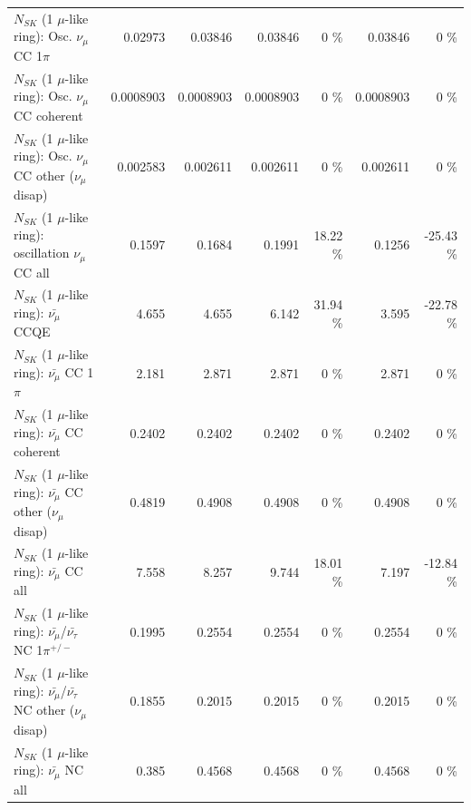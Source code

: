 \begin{table}
\begin{tabular}{| l | r | r | r  r | r  r |}
                          $N_{SK}$ (1 $\mu$-like ring): Osc. $\nu_\mu$ CC 1$\pi$ &         0.02973 &         0.03846 &         0.03846 &        0 \%  &         0.03846 &        0 \%  \\ 
                        $N_{SK}$ (1 $\mu$-like ring): Osc. $\nu_\mu$ CC coherent &       0.0008903 &       0.0008903 &       0.0008903 &        0 \%  &       0.0008903 &        0 \%  \\ 
         $N_{SK}$ (1 $\mu$-like ring): Osc. $\nu_\mu$ CC other ($\nu_\mu$ disap) &        0.002583 &        0.002611 &        0.002611 &        0 \%  &        0.002611 &        0 \%  \\ 
                      $N_{SK}$ (1 $\mu$-like ring): oscillation $\nu_\mu$ CC all &          0.1597 &          0.1684 &          0.1991 &    18.22 \%  &          0.1256 &   -25.43 \%  \\ 
\hline
\hline
                              $N_{SK}$ (1 $\mu$-like ring): $\bar{\nu_\mu}$ CCQE &           4.655 &           4.655 &           6.142 &    31.94 \%  &           3.595 &   -22.78 \%  \\ 
                         $N_{SK}$ (1 $\mu$-like ring): $\bar{\nu_\mu}$ CC 1$\pi$ &           2.181 &           2.871 &           2.871 &        0 \%  &           2.871 &        0 \%  \\ 
                       $N_{SK}$ (1 $\mu$-like ring): $\bar{\nu_\mu}$ CC coherent &          0.2402 &          0.2402 &          0.2402 &        0 \%  &          0.2402 &        0 \%  \\ 
        $N_{SK}$ (1 $\mu$-like ring): $\bar{\nu_\mu}$ CC other ($\nu_\mu$ disap) &          0.4819 &          0.4908 &          0.4908 &        0 \%  &          0.4908 &        0 \%  \\ 
                          $N_{SK}$ (1 $\mu$-like ring): $\bar{\nu_{\mu}}$ CC all &           7.558 &           8.257 &           9.744 &    18.01 \%  &           7.197 &   -12.84 \%  \\ 
\hline
  $N_{SK}$ (1 $\mu$-like ring): $\bar{\nu_\mu}$/$\bar{\nu_\tau}$ NC 1$\pi^{+/-}$ &          0.1995 &          0.2554 &          0.2554 &        0 \%  &          0.2554 &        0 \%  \\ 
$N_{SK}$ (1 $\mu$-like ring): $\bar{\nu_\mu}$/$\bar{\nu_\tau}$ NC other ($\nu_\mu$ disap) &          0.1855 &          0.2015 &          0.2015 &        0 \%  &          0.2015 &        0 \%  \\ 
                          $N_{SK}$ (1 $\mu$-like ring): $\bar{\nu_{\mu}}$ NC all &           0.385 &          0.4568 &          0.4568 &        0 \%  &          0.4568 &        0 \%  \\ 

\end{tabular}
\end{table}
